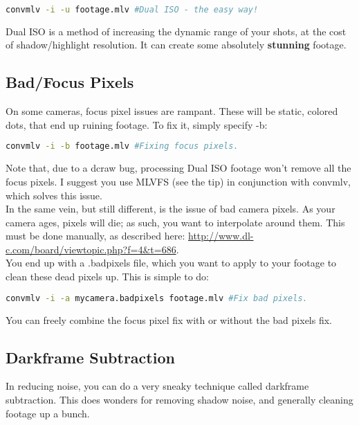 \documentclass[a4paper,12pt]{article}
\begin{document}
\begin{lstlisting}[language=bash]
	convmlv -i -u footage.mlv #Dual ISO - the easy way!
\end{lstlisting}

	Dual ISO is a method of increasing the dynamic range of your shots, at the cost of shadow/highlight resolution. It can create some
	absolutely \textbf{stunning} footage.

	\subsection{Bad/Focus Pixels}
		On some cameras, focus pixel issues are rampant. These will be static, colored dots, that end up ruining footage. To fix it, simply specify -b:
		
\begin{lstlisting}[language=bash]
	convmlv -i -b footage.mlv #Fixing focus pixels.
\end{lstlisting}

		Note that, due to a dcraw bug, processing Dual ISO footage won't remove all the focus pixels. I suggest you use MLVFS (see the tip) in conjunction with convmlv,
		which solves this issue.\\
		
		In the same vein, but still different, is the issue of bad camera pixels. As your camera ages, pixels will die; as such, you want to interpolate around
		them. This must be done manually, as described here: \url{http://www.dl-c.com/board/viewtopic.php?f=4&t=686}.\\
		
		You end up with a .badpixels file, which you want to apply to your footage to clean these dead pixels up. This is simple to do:
		
\begin{lstlisting}[language=bash]
	convmlv -i -a mycamera.badpixels footage.mlv #Fix bad pixels.
\end{lstlisting}
		
		You can freely combine the focus pixel fix with or without the bad pixels fix.
		
	\subsection{Darkframe Subtraction}
		In reducing noise, you can do a very sneaky technique called darkframe subtraction. This does wonders for removing shadow noise, and generally
		cleaning footage up a bunch.
		
\end{document}
